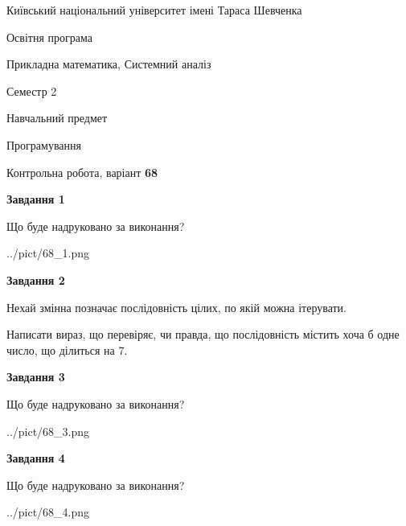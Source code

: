 \documentclass[12pt, ukrainian]{article}
\begin{document}
{{\begin {small}\par
{ \center  Київський національний університет імені Тараса Шевченка \par}
{\parbox {5 cm}{Освітня програма \hfill}{\parbox {8 cm}{Прикладна математика, Системний аналіз \hfill}}\parbox {5 cm}{\hfill Семестр 2}}\par
{\parbox {5 cm} {Навчальний предмет \hfill}\parbox {7 cm}{Програмування \hfill}\parbox {6cm}{\hfill}\par}\vspace{-7pt} \end{small}}{\center Контрольна робота, варіант  \No \textbf
{ 68 }\par}}
{
\begin {large}
{\begin {center}\textbf{Завдання 1}\end {center}}\par
Що буде надруковано за виконання?\par\par
\begin{center}
	{../pict/68_1.png}
\end{center}
\newpage

{\begin {center}\textbf{Завдання 2}\end {center}}\par
Нехай змінна  позначає послідовність цілих, по якій можна ітерувати.

Написати вираз, що перевіряє, чи правда, що послідовність  містить хоча б одне число, що ділиться на 7.\par
\newpage

{\begin {center}\textbf{Завдання 3}\end {center}}\par
Що буде надруковано за виконання?
\begin{center}
	{../pict/68_3.png}
\end{center}
\newpage

{\begin {center}\textbf{Завдання 4}\end {center}}\par
Що буде надруковано за виконання?\par
\begin{center}
	{../pict/68_4.png}
\end{center}
\newpage


\end{large}}
\end{document}
